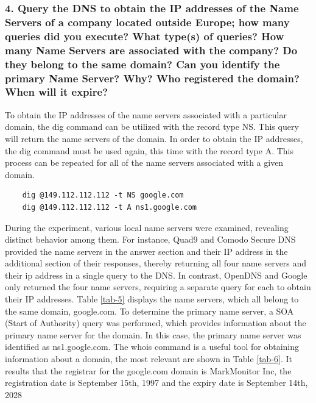 \documentclass[eng]{class}
\begin{document}
\subsubsection*{4. Query the DNS to obtain the IP addresses of the Name Servers of a company
  located outside Europe; how many queries did you execute? What type(s) of
  queries? How many Name Servers are associated with the company? Do they
  belong to the same domain? Can you identify the primary Name Server? Why?
  Who registered the domain? When will it expire?}
To obtain the IP addresses of the name servers associated with a particular domain, the dig command can be utilized with the record type NS.
This query will return the name servers of the domain.
In order to obtain the IP addresses, the dig command must be used again, this time with the record type A.
This process can be repeated for all of the name servers associated with a given domain.
\begin{lstlisting}
    dig @149.112.112.112 -t NS google.com
    dig @149.112.112.112 -t A ns1.google.com
\end{lstlisting}
During the experiment, various local name servers were examined, revealing distinct behavior among them.
For instance, Quad9 and Comodo Secure DNS provided the name servers in the answer section and their IP address in the additional section of their responses,
thereby returning all four name servers and their ip address in a single query to the DNS.
In contrast, OpenDNS and Google only returned the four name servers, requiring a separate query for each to obtain their IP addresses.\newline
Table \ref*{tab-5} displays the name servers, which all belong to the same domain, google.com.\newline
To determine the primary name server, a SOA (Start of Authority) query was performed,
which provides information about the primary name server for the domain.
In this case, the primary name server was identified as ns1.google.com.\newline
\noindent
The whois command is a useful tool for obtaining information about a domain, the most relevant are shown in Table \ref{tab-6}.
It results that the registrar for the  google.com domain is MarkMonitor Inc, the registration date is September 15th, 1997 and the expiry date is September 14th, 2028
\end{document}
